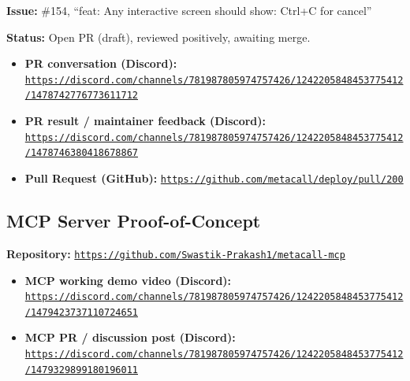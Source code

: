 \documentclass[12pt, a4paper]{article}
\begin{document}
\textbf{Issue:} \#154, ``feat: Any interactive screen should show:
Ctrl+C for cancel''

\textbf{Status:} Open PR (draft), reviewed positively, awaiting merge.

\begin{infobox}
\begin{itemize}[leftmargin=1.2em, itemsep=4pt]
  \item \textbf{PR conversation (Discord):}
  \href{https://discord.com/channels/781987805974757426/1242205848453775412/1478742776773611712}
  {\nolinkurl{https://discord.com/channels/781987805974757426/1242205848453775412/1478742776773611712}}

  \item \textbf{PR result / maintainer feedback (Discord):}
  \href{https://discord.com/channels/781987805974757426/1242205848453775412/1478746380418678867}
  {\nolinkurl{https://discord.com/channels/781987805974757426/1242205848453775412/1478746380418678867}}

  \item \textbf{Pull Request (GitHub):}
  \href{https://github.com/metacall/deploy/pull/200}
  {\nolinkurl{https://github.com/metacall/deploy/pull/200}}
\end{itemize}
\end{infobox}

\subsection{MCP Server Proof-of-Concept}

\textbf{Repository:}
\href{https://github.com/Swastik-Prakash1/metacall-mcp}
{\nolinkurl{https://github.com/Swastik-Prakash1/metacall-mcp}}

\begin{infobox}
\begin{itemize}[leftmargin=1.2em, itemsep=4pt]
  \item \textbf{MCP working demo video (Discord):}
  \href{https://discord.com/channels/781987805974757426/1242205848453775412/1479423737110724651}
  {\nolinkurl{https://discord.com/channels/781987805974757426/1242205848453775412/1479423737110724651}}

  \item \textbf{MCP PR / discussion post (Discord):}
  \href{https://discord.com/channels/781987805974757426/1242205848453775412/1479329899180196011}
  {\nolinkurl{https://discord.com/channels/781987805974757426/1242205848453775412/1479329899180196011}}
\end{itemize}
\end{infobox}
\end{document}

